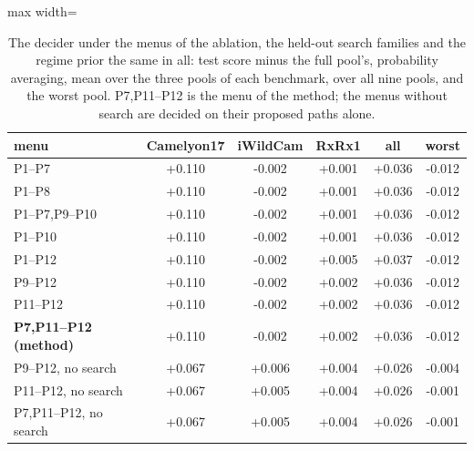 \begin{table}[t]
\centering
\footnotesize
\caption{The decider under the menus of the ablation, the held-out search families and the regime prior the same in all: test score minus the full pool's, probability averaging, mean over the three pools of each benchmark, over all nine pools, and the worst pool. P7,P11--P12 is the menu of the method; the menus without search are decided on their proposed paths alone.}
\label{tab:menus}
\setlength{\tabcolsep}{4pt}\begin{adjustbox}{max width=\linewidth}
\begin{tabular}{lccccc}
\toprule
menu & Camelyon17 & iWildCam & RxRx1 & all & worst \\
\midrule
P1--P7 & +0.110 & -0.002 & +0.001 & +0.036 & -0.012 \\
P1--P8 & +0.110 & -0.002 & +0.001 & +0.036 & -0.012 \\
P1--P7,P9--P10 & +0.110 & -0.002 & +0.001 & +0.036 & -0.012 \\
P1--P10 & +0.110 & -0.002 & +0.001 & +0.036 & -0.012 \\
P1--P12 & +0.110 & -0.002 & +0.005 & +0.037 & -0.012 \\
P9--P12 & +0.110 & -0.002 & +0.002 & +0.036 & -0.012 \\
P11--P12 & +0.110 & -0.002 & +0.002 & +0.036 & -0.012 \\
\textbf{P7,P11--P12 (method)} & +0.110 & -0.002 & +0.002 & +0.036 & -0.012 \\
P9--P12, no search & +0.067 & +0.006 & +0.004 & +0.026 & -0.004 \\
P11--P12, no search & +0.067 & +0.005 & +0.004 & +0.026 & -0.001 \\
P7,P11--P12, no search & +0.067 & +0.005 & +0.004 & +0.026 & -0.001 \\
\bottomrule
\end{tabular}
\end{adjustbox}
\end{table}
